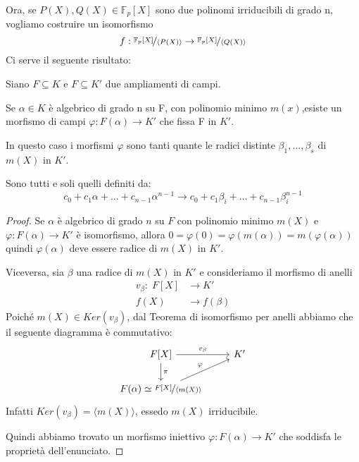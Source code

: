 \documentclass[../main.tex]{subfiles}
\begin{document}
Ora, se $P(X), Q(X) \in \mathbb{F}_p[X]$ sono due polinomi irriducibili di grado n, vogliamo costruire un isomorfismo
\begin{equation*}
    f: \nicefrac{\mathbb{F}_p[X]}{\langle P(X)\rangle} \rightarrow \nicefrac{\mathbb{F}_p[X]}{\langle Q(X)\rangle}
\end{equation*}
Ci serve il seguente risultato:

\begin{proposition}
    Siano $F \subseteq K$ e $F \subseteq K'$ due ampliamenti di campi.

    Se $\alpha \in K$ è algebrico di grado n su F, con polinomio minimo $m(x)$,esiste un morfismo di campi $\varphi : F(\alpha) \rightarrow K'$ che fissa F in $K'$.

    In questo caso i morfismi $\varphi$ sono tanti quante le radici distinte $\beta_1, \ldots ,\beta_s$ di $m(X)$ in $K'$.

    Sono tutti e soli quelli definiti da:
    \begin{equation*}
        c_0 + c_1\alpha + \ldots + c_{n-1}\alpha^{n-1} \rightarrow c_0 + c_1\beta_i + \ldots + c_{n-1}\beta_i^{n-1}
    \end{equation*}
\end{proposition}

\begin{proof}
    Se $\alpha$ è algebrico di grado $n$ su $F$ con polinomio minimo $m(X)$ e $\varphi : F(\alpha) \rightarrow K'$ è isomorfismo, allora $0 = \varphi(0) = \varphi(m(\alpha)) = m(\varphi(\alpha))$  quindi $\varphi(\alpha)$ deve essere radice di $m(X)$ in $K'$.

    Viceversa, sia $\beta$ una radice di $m(X)$ in $K'$ e consideriamo il morfismo di anelli
    \begin{align*}
        v_\beta : \; F[X] & \rightarrow K'       \\
        f(X)              & \rightarrow f(\beta)
    \end{align*}
    Poiché $m(X) \in Ker(v_\beta)$, dal Teorema di isomorfismo per anelli abbiamo che il seguente diagramma è commutativo:
    \begin{equation*}
        \begin{tikzcd}
            F[X] \arrow{r}{v_\beta} \arrow{d}{\pi} & K'\\
            F(\alpha) \simeq \nicefrac{F[X]}{\langle m(X)\rangle} \arrow{ur}{\varphi}
        \end{tikzcd}
    \end{equation*}
    Infatti $Ker(v_\beta) = \langle m(X)\rangle$, essedo $m(X)$ irriducibile.

    Quindi abbiamo trovato un morfismo iniettivo $\varphi : F(\alpha) \rightarrow K'$ che soddisfa le proprietà dell'enunciato.
\end{proof}
\end{document}
